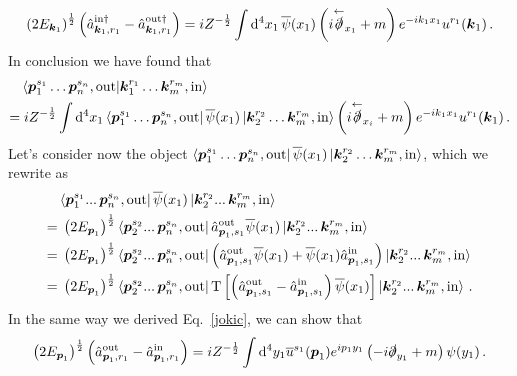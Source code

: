 \begin{sol}
    \begin{equation}
    \label{jokic}
        \left( 2 E_{\boldsymbol{k}_1} \right)^{\frac{1}{2}} \left(\hat{a}^{{\rm in}\dagger}_{\boldsymbol{k}_1, r_1}-\hat{a}^{{\rm out}\dagger}_{\boldsymbol{k}_1, r_1} \right) = i Z^{-\frac{1}{2}} \int {\rm d}^4 x_1 \, \overline{\psi}(x_1) \left( i \overset{\leftarrow}{\slashed{\partial}}_{x_1} + m\right) e^{-i k_1 x_1} u^{r_1}(\boldsymbol{k}_1)\,.
    \end{equation}
    In conclusion we have found that
    \begin{equation}
    \label{topolino}
    \begin{split}
        &\braket{\boldsymbol{p}_1^{s_1} \dots \boldsymbol{p}_n^{s_n}, {\rm out}}{\boldsymbol{k}_1^{r_1} \dots \boldsymbol{k}_m^{r_m}, {\rm in}} \\
        = &\; i Z^{-\frac{1}{2}} \int {\rm d}^4 x_1 \bra{\boldsymbol{p}_1^{s_1} \dots \boldsymbol{p}_n^{s_n}, {\rm out}}\overline{\psi}(x_1) \ket{\boldsymbol{k}_2^{r_2} \dots \boldsymbol{k}_m^{r_m}, {\rm in}}\left( i \overset{\leftarrow}{\slashed{\partial}}_{x_i} + m\right) e^{-i k_1 x_1} u^{r_1}(\boldsymbol{k}_1)\,.
        \end{split}
    \end{equation}
    Let's consider now the object $\bra{\boldsymbol{p}_1^{s_1} \dots \boldsymbol{p}_n^{s_n}, {\rm out}}\overline{\psi}(x_1) \ket{\boldsymbol{k}_2^{r_2} \dots \boldsymbol{k}_m^{r_m}, {\rm in}}$, which we rewrite as
    \begin{align}
        &\bra{\boldsymbol{p}_1^{s_1} ...\, \boldsymbol{p}_n^{s_n}, {\rm out}}\overline{\psi}(x_1) \ket{\boldsymbol{k}_2^{r_2} ...\, \boldsymbol{k}_m^{r_m}, {\rm in}}  \notag \\
        = & \; \left(2E_{\boldsymbol{p}_1}\right)^{\frac{1}{2}}\bra{\boldsymbol{p}_2^{s_2} ...\, \boldsymbol{p}_n^{s_n}, {\rm out}}\hat{a}^{\rm out}_{\boldsymbol{p}_1, s_1}\overline{\psi}(x_1) \ket{\boldsymbol{k}_2^{r_2} ...\, \boldsymbol{k}_m^{r_m}, {\rm in}} \notag \\
        = & \; \left(2E_{\boldsymbol{p}_1}\right)^{\frac{1}{2}}\bra{\boldsymbol{p}_2^{s_2} ...\, \boldsymbol{p}_n^{s_n}, {\rm out}}\left( \hat{a}^{\rm out}_{\boldsymbol{p}_1, s_1}\overline{\psi}(x_1) + \overline{\psi}(x_1) \hat{a}^{\rm in}_{\boldsymbol{p}_1, s_1} \right)\ket{\boldsymbol{k}_2^{r_2} ...\, \boldsymbol{k}_m^{r_m}, {\rm in}} \notag \\
        = & \; \left(2E_{\boldsymbol{p}_1}\right)^{\frac{1}{2}}\bra{\boldsymbol{p}_2^{s_2} ...\, \boldsymbol{p}_n^{s_n}, {\rm out}}\mathbf{\rm T} \left[ \left(\hat{a}^{\rm out}_{\boldsymbol{p}_1, s_1} - \hat{a}^{\rm in}_{\boldsymbol{p}_1, s_1} \right)\overline{\psi}(x_1)\right]\ket{\boldsymbol{k}_2^{r_2} ...\, \boldsymbol{k}_m^{r_m}, {\rm in}} \,. \label{ercapitano}
    \end{align}
    In the same way we derived Eq.~\eqref{jokic}, we can show that
    \begin{equation}
    \label{nowitzki}
        \left( 2 E_{\vp_1} \right)^{\frac{1}{2}} \left(\aoutdes_{\vp_1, r_1} - \aindes_{\vp_1, r_1} \right) = i Z^{-\frac{1}{2}} \int \rmd^4 y_1 \sbar{u}^{s_1}(\vp_1) e^{i p_1 y_1} \left( -i \slashed{\partial}_{y_1} + m\right) \psi(y_1)\,.

\end{equation}
\end{sol}
